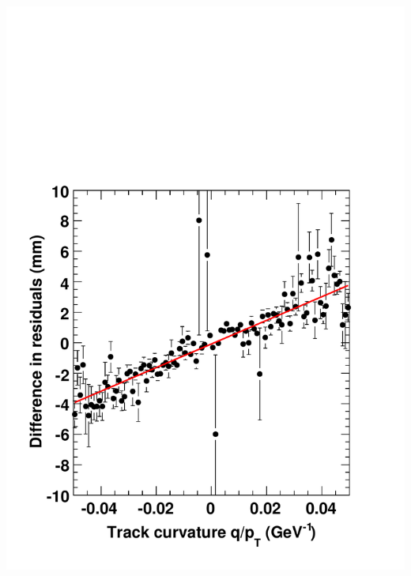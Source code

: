 \documentclass[compress]{beamer}
\begin{document}
\begin{frame}
\begin{columns}
\includegraphics[width=\linewidth]{demo_qoverpt.pdf}
\end{columns}
\end{frame}
\end{document}

